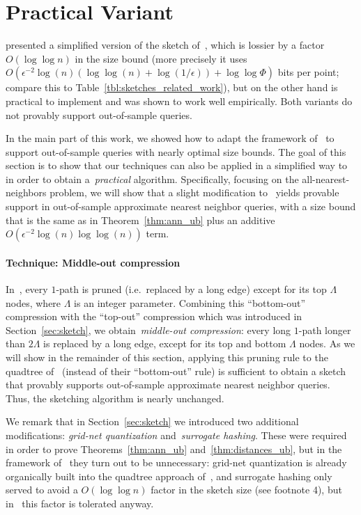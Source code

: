 \section{Practical Variant}\label{sec:middleout}
\cite{indyk2017practical} presented a simplified version of the sketch of~\cite{indyk2017near}, which is lossier by a factor $O(\log\log n)$ in the size bound (more precisely it uses $O(\epsilon^{-2}\log(n)(\log\log(n) + \log(1/\epsilon))+\log\log\Phi)$ bits per point; compare this to Table~\ref{tbl:sketches_related_work}), but on the other hand is practical to implement and was shown to work well empirically.
Both variants do not provably support out-of-sample queries.

In the main part of this work, we showed how to adapt the framework of~\cite{indyk2017near} to support out-of-sample queries with nearly optimal size bounds.
The goal of this section is to show that our techniques can also be applied in a simplified way to~\cite{indyk2017practical} in order to obtain a~\emph{practical} algorithm.
Specifically, focusing on the all-nearest-neighbors problem, we will show that a slight modification to~\cite{indyk2017practical} yields provable support in out-of-sample approximate nearest neighbor queries, with a size bound that is the same as in Theorem~\ref{thm:ann_ub} plus an additive $O(\epsilon^{-2}\log(n)\log\log(n))$ term.

\paragraph{Technique: Middle-out compression}
In~\cite{indyk2017practical}, every $1$-path is pruned (i.e.~replaced by a long edge) except for its top $\Lambda$ nodes, where $\Lambda$ is an integer parameter.
Combining this ``bottom-out'' compression with the ``top-out'' compression which was introduced in Section~\ref{sec:sketch}, we obtain~\emph{middle-out compression}: every long $1$-path longer than $2\Lambda$ is replaced by a long edge, except for its top and bottom $\Lambda$ nodes.
As we will show in the remainder of this section, applying this pruning rule to the quadtree of~\cite{indyk2017practical} (instead of their ``bottom-out'' rule) is sufficient to obtain a sketch that provably supports out-of-sample approximate nearest neighbor queries. Thus, the sketching algorithm is nearly unchanged.

We remark that in Section~\ref{sec:sketch} we introduced two additional modifications: \emph{grid-net quantization} and~\emph{surrogate hashing}. These were required in order to prove Theorems~\ref{thm:ann_ub} and~\ref{thm:distances_ub}, but in the framework of~\cite{indyk2017practical} they turn out to be unnecessary: grid-net quantization is already organically built into the quadtree approach of~\cite{indyk2017practical}, and surrogate hashing only served to avoid a $O(\log\log n)$ factor in the sketch size (see footnote 4), but in~\cite{indyk2017practical} this factor is tolerated anyway.

